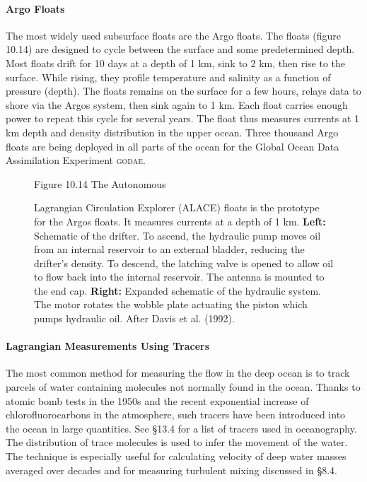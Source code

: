 \paragraph{Argo Floats}
The most widely used subsurface floats are the Argo
floats. The floats (figure 10.14) are designed to
cycle between the surface and some predetermined depth. Most floats
drift for 10 days at a depth of 1 km, sink to 2 km, then rise to the
surface. While rising, they profile temperature and salinity as a
function of pressure (depth). The floats remains on the surface for a
few hours, relays data to shore via the Argos system, then sink again to 1 km. Each float carries enough power to
repeat this cycle for several years. The float thus measures currents
at 1 km depth and density distribution in the upper ocean. Three
thousand Argo floats are being deployed in all parts of the ocean for
the Global Ocean Data Assimilation Experiment
\textsc{godae}.

\begin{figure}[h!]
\vspace{-2ex}
\footnotesize
Figure 10.14 The Autonomous \rule{0mm}{4ex}Lagrangian Circulation
Explorer (ALACE) floats is the prototype for the
Argos floats. It measures currents at a depth of 1 km. \textbf{Left:}
Schematic of the drifter. To ascend, the hydraulic pump moves oil from
an internal reservoir to an external bladder, reducing the drifter's
density. To descend, the latching valve is opened to allow oil to flow
back into the internal reservoir.  The antenna is mounted to the end
cap. \textbf{Right:} Expanded schematic of the hydraulic system. The
motor rotates the wobble plate actuating the piston which pumps
hydraulic oil. After Davis et al. (1992).
\label{fig:alace}
\vspace{-2ex}
\end{figure}

\paragraph{Lagrangian Measurements Using Tracers}
The most common
method for measuring the flow in the deep ocean is to track parcels of
water containing molecules not normally found in the ocean.  Thanks to
atomic bomb tests in the 1950s and the recent exponential increase of
chlorofluorocarbons in the atmosphere, such tracers have been
introduced into the ocean in large quantities. See \S 13.4 for a list
of tracers used in oceanography. The distribution of trace molecules
is used to infer the movement of the water. The technique is
especially useful for calculating velocity of deep water masses
averaged over decades and for measuring turbulent mixing discussed in
\S 8.4.

